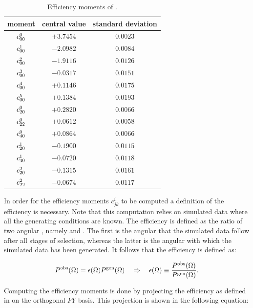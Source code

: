 \begin{table}[!t]
  \centering
  \renewcommand{\arraystretch}{1.2}
  \begin{tabular}{ccc}
    \hline
    moment & central value & standard deviation \\
    \hline
  $c^{0}_{00}$   & $+3.7454$  &  $0.0023$  \\
  $c^{1}_{00}$   & $-2.0982$  &  $0.0084$  \\
  $c^{2}_{00}$   & $-1.9116$  &  $0.0126$  \\
  $c^{3}_{00}$   & $-0.0317$  &  $0.0151$  \\
  $c^{4}_{00}$   & $+0.1146$  &  $0.0175$  \\
  $c^{5}_{00}$   & $+0.1384$  &  $0.0193$  \\
  $c^{0}_{20}$   & $+0.2820$  &  $0.0066$  \\
  $c^{0}_{22}$   & $+0.0612$  &  $0.0058$  \\
  $c^{0}_{40}$   & $+0.0864$  &  $0.0066$  \\
  $c^{1}_{20}$   & $-0.1900$  &  $0.0115$  \\
  $c^{1}_{40}$   & $-0.0720$  &  $0.0118$  \\
  $c^{2}_{20}$   & $-0.1315$  &  $0.0161$  \\
  $c^{2}_{22}$   & $-0.0674$  &  $0.0117$  \\
  \hline
  \end{tabular}
  \caption{Efficiency moments of \BsJpsiKst.}
   \label{eff_moms_table}
\end{table}

In order for the efficiency moments $c^i_{jk}$ to be computed a definition of the efficiency is necessary. Note that this computation relies on
simulated data where all the generating conditions are known. The efficiency is defined as the ratio of two angular \pdfs, namely
\Pobs and \Pgen. The first is the angular \pdf that the simulated data follow after all stages of selection, whereas
the latter is the angular \pdf with which the simulated data has been generated.
It follows that the efficiency is defined as:

\begin{equation}
  \centering
  \Pobs = \epsilon(\Omega) \Pgen \quad \Rightarrow \quad \epsilon(\Omega) \equiv \frac{\Pobs}{\Pgen}.
  \label{eff_def}
\end{equation}

\noindent Computing the efficiency moments is done by projecting the efficiency as defined in 
on the orthogonal $PY$ basis. This projection is shown in the following equation:

